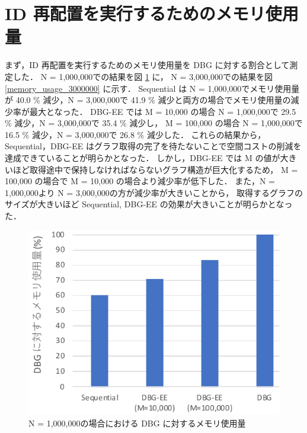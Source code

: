 \section{ID 再配置を実行するためのメモリ使用量}
まず，ID 再配置を実行するためのメモリ使用量を DBG に対する割合として測定した．
N = 1,000,000での結果を図 \ref{memory_usage_1000000} に，
N = 3,000,000での結果を図 \ref{memory_usage_3000000} に示す． 
Sequential は N = 1,000,000でメモリ使用量が 40.0 \% 減少，N = 3,000,000で 41.9 \% 減少と両方の場合でメモリ使用量の減少率が最大となった．
DBG-EE では M = 10,000 の場合 N = 1,000,000で 29.5 \% 減少，N = 3,000,000で 35.4 \% 減少し，
M = 100,000 の場合 N = 1,000,000で 16.5 \% 減少，N = 3,000,000で 26.8 \% 減少した．
これらの結果から，Sequential，DBG-EE はグラフ取得の完了を待たないことで空間コストの削減を達成できていることが明らかとなった．
しかし，DBG-EE では M の値が大きいほど取得途中で保持しなければならないグラフ構造が巨大化するため，
M = 100,000 の場合で M = 10,000 の場合より減少率が低下した．
また，N = 1,000,000より N = 3,000,000の方が減少率が大きいことから，
取得するグラフのサイズが大きいほど Sequential, DBG-EE の効果が大きいことが明らかとなった．
\begin{figure}[t]
  \centering
  \includegraphics[width=0.8\linewidth]{./figure/memory_usage_10000.pdf}
  \caption{N = 1,000,000の場合における DBG に対するメモリ使用量}
  \label{memory_usage_1000000}
\end{figure}

